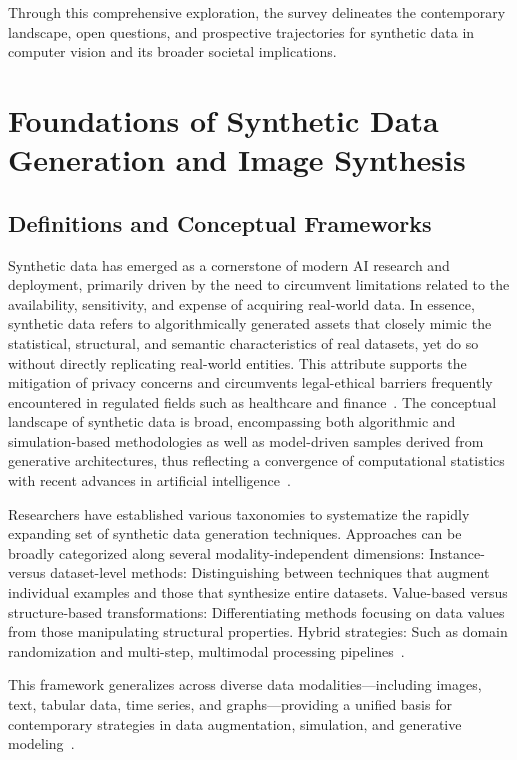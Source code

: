 \documentclass[sigconf]{acmart}
\begin{document}
Through this comprehensive exploration, the survey delineates the contemporary landscape, open questions, and prospective trajectories for synthetic data in computer vision and its broader societal implications.

\section{Foundations of Synthetic Data Generation and Image Synthesis}

\subsection{Definitions and Conceptual Frameworks}

Synthetic data has emerged as a cornerstone of modern AI research and deployment, primarily driven by the need to circumvent limitations related to the availability, sensitivity, and expense of acquiring real-world data. In essence, synthetic data refers to algorithmically generated assets that closely mimic the statistical, structural, and semantic characteristics of real datasets, yet do so without directly replicating real-world entities. This attribute supports the mitigation of privacy concerns and circumvents legal-ethical barriers frequently encountered in regulated fields such as healthcare and finance~\cite{ref87}. The conceptual landscape of synthetic data is broad, encompassing both algorithmic and simulation-based methodologies as well as model-driven samples derived from generative architectures, thus reflecting a convergence of computational statistics with recent advances in artificial intelligence~\cite{ref1,ref13,ref64,ref87}.

Researchers have established various taxonomies to systematize the rapidly expanding set of synthetic data generation techniques. Approaches can be broadly categorized along several modality-independent dimensions:
Instance- versus dataset-level methods: Distinguishing between techniques that augment individual examples and those that synthesize entire datasets.
Value-based versus structure-based transformations: Differentiating methods focusing on data values from those manipulating structural properties.
Hybrid strategies: Such as domain randomization and multi-step, multimodal processing pipelines~\cite{ref1,ref13,ref64,ref81,ref87}.

This framework generalizes across diverse data modalities—including images, text, tabular data, time series, and graphs—providing a unified basis for contemporary strategies in data augmentation, simulation, and generative modeling~\cite{ref13,ref64,ref75,ref81,ref87,ref88}.
\end{document}
